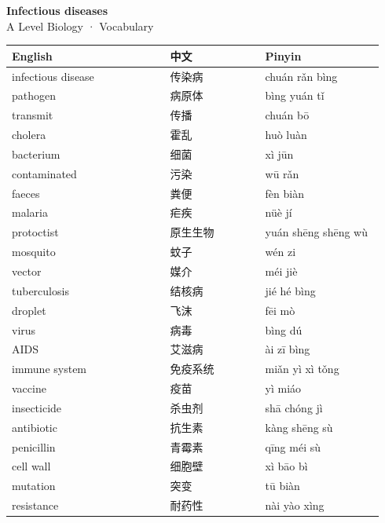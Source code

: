 \documentclass[11pt]{article}
\begin{document}
\begin{center}
  {\LARGE\bfseries Infectious diseases}\\[0.35em]
  {\large A Level Biology · Vocabulary}
\end{center}
\vspace{0.6em}

\begin{longtable}{@{}p{0.40\linewidth}p{0.24\linewidth}p{0.30\linewidth}@{}}
\toprule
\textbf{English} & \textbf{中文} & \textbf{Pinyin} \\
\midrule
\endhead
\bottomrule
\endlastfoot
infectious disease & 传染病 & chuán rǎn bìng \\
pathogen & 病原体 & bìng yuán tǐ \\
transmit & 传播 & chuán bō \\
cholera & 霍乱 & huò luàn \\
bacterium & 细菌 & xì jūn \\
contaminated & 污染 & wū rǎn \\
faeces & 粪便 & fèn biàn \\
malaria & 疟疾 & nüè jí \\
protoctist & 原生生物 & yuán shēng shēng wù \\
mosquito & 蚊子 & wén zi \\
vector & 媒介 & méi jiè \\
tuberculosis & 结核病 & jié hé bìng \\
droplet & 飞沫 & fēi mò \\
virus & 病毒 & bìng dú \\
AIDS & 艾滋病 & ài zī bìng \\
immune system & 免疫系统 & miǎn yì xì tǒng \\
vaccine & 疫苗 & yì miáo \\
insecticide & 杀虫剂 & shā chóng jì \\
antibiotic & 抗生素 & kàng shēng sù \\
penicillin & 青霉素 & qīng méi sù \\
cell wall & 细胞壁 & xì bāo bì \\
mutation & 突变 & tū biàn \\
resistance & 耐药性 & nài yào xìng \\
\end{longtable}
\end{document}
